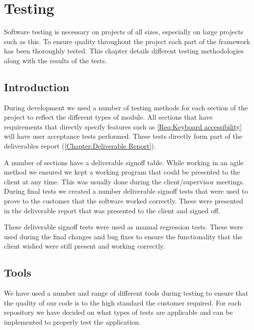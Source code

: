 
\chapter{Testing} \label{Chapter: Testing}

\begin{preamble}
Software testing is necessary on projects of all sizes, especially on large projects such as this. To ensure quality throughout the project each part of the framework has been thoroughly tested. This chapter details different testing methodologies along with the results of the tests.
\end{preamble}

\section{Introduction}

During development we used a number of testing methods for each section of the project to reflect the different types of module. All sections that have requirements that directly specify features such as \cref{Req:Keyboard accessibility} will have user acceptance tests performed. These tests directly form part of the deliverables report (\autoref{Chapter:Deliverable Report}).

A number of sections have a deliverable signoff table. While working in an agile method we ensured we kept a working program that could be presented to the client at any time. This was usually done during the client/supervisor meetings. During final tests we created a number deliverable signoff tests that were used to prove to the customer that the software worked correctly. These were presented in the deliverable report that was presented to the client and signed off.

These deliverable signoff tests were used as manual regression tests. These were used during the final changes and bug fixes to ensure the functionality that the client wished were still present and working correctly.

\section{Tools}

We have used a number and range of different tools during testing to ensure that the quality of our code is to the high standard the customer required. For each repository we have decided on what types of tests are applicable and can be implemented to properly test the application.

